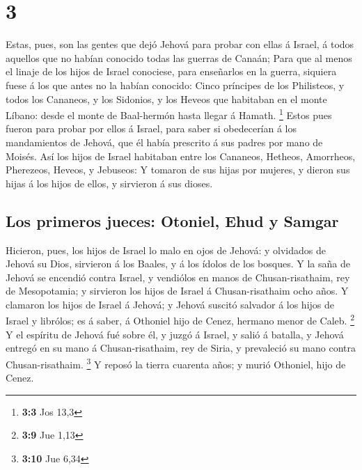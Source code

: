 \hypertarget{section-2}{%
\section{3}\label{section-2}}

 Estas, pues, son las gentes que dejó Jehová para probar
con ellas á Israel, á todos aquellos que no habían conocido todas las
guerras de Canaán;  Para que al menos el linaje de los
hijos de Israel conociese, para enseñarlos en la guerra, siquiera fuese
á los que antes no la habían conocido:  Cinco príncipes de
los Philisteos, y todos los Cananeos, y los Sidonios, y los Heveos que
habitaban en el monte Líbano: desde el monte de Baal-hermón hasta llegar
á Hamath. \footnote{\textbf{3:3} Jos 13,3}  Estos pues
fueron para probar por ellos á Israel, para saber si obedecerían á los
mandamientos de Jehová, que él había prescrito á sus padres por mano de
Moisés.  Así los hijos de Israel habitaban entre los
Cananeos, Hetheos, Amorrheos, Pherezeos, Heveos, y Jebuseos:
 Y tomaron de sus hijas por mujeres, y dieron sus hijas á
los hijos de ellos, y sirvieron á sus dioses.

\hypertarget{los-primeros-jueces-otoniel-ehud-y-samgar}{%
\subsection{Los primeros jueces: Otoniel, Ehud y
Samgar}\label{los-primeros-jueces-otoniel-ehud-y-samgar}}

 Hicieron, pues, los hijos de Israel lo malo en ojos de
Jehová: y olvidados de Jehová su Dios, sirvieron á los Baales, y á los
ídolos de los bosques.  Y la saña de Jehová se encendió
contra Israel, y vendiólos en manos de Chusan-risathaim, rey de
Mesopotamia; y sirvieron los hijos de Israel á Chusan-risathaim ocho
años.  Y clamaron los hijos de Israel á Jehová; y Jehová
suscitó salvador á los hijos de Israel y librólos; es á saber, á
Othoniel hijo de Cenez, hermano menor de Caleb. \footnote{\textbf{3:9}
  Jue 1,13}  Y el espíritu de Jehová fué sobre él, y
juzgó á Israel, y salió á batalla, y Jehová entregó en su mano á
Chusan-risathaim, rey de Siria, y prevaleció su mano contra
Chusan-risathaim. \footnote{\textbf{3:10} Jue 6,34}  Y
reposó la tierra cuarenta años; y murió Othoniel, hijo de Cenez.

